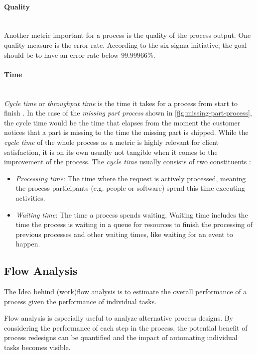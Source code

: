 \paragraph{Quality}~\\
Another metric important for a process is the quality of the process output. One quality measure is the error rate. According to the six sigma initiative, the goal should be to have an error rate below $99.99966\%$.

\paragraph{Time}~\\
\textit{Cycle time} or \textit{throughput time} is the time it takes for a process from start to finish \cite{Six-sigma-terms}. In the case of the \textit{missing part process} shown in \ref{fig:missing-part-process}, the cycle time would be the time that elapses from the moment the customer notices that a part is missing to the time the missing part is shipped. While the \textit{cycle time} of the whole process as a metric is highly relevant for client satisfaction, it is on its own usually not tangible when it comes to the improvement of the process. The \textit{cycle time} usually consists of two constituents \cite{fundamentals}:
\begin{itemize}
	\item \textit{Processing time}: The time where the request is actively processed, meaning the process participants (e.g. people or software) spend this time executing activities. 
	\item \textit{Waiting time}: The time a process spends waiting. Waiting time includes the time the process is waiting in a queue for resources to finish the processing of previous processes and other waiting times, like waiting for an event to happen.
\end{itemize}

\subsection{Flow Analysis}
The Idea behind (work)flow analysis is to estimate the overall performance of a process given the performance of individual tasks.  

Flow analysis is especially useful to analyze alternative process designs. By considering the performance of each step in the process, the potential benefit of process redesigns can be quantified and the impact of automating individual tasks becomes visible.

